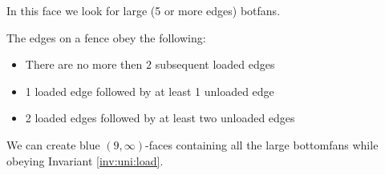    In this face we look for large (5 or more edges) botfans.

    \begin{invariants}
      \label{inv:uni:load}
      \item The edges on a fence obey the following:
      \begin{itemize}
        \item There are no more then $2$ subsequent loaded edges
        \item 1 loaded edge followed by at least 1 unloaded edge
        \item 2 loaded edges followed by at least two unloaded edges
      \end{itemize}
    \end{invariants}


    \begin{lemma}
      \label{lm:uni:removingLargeB-fans}
      We can create blue $(9, \infty)$-faces containing all the large bottomfans while obeying Invariant \ref{inv:uni:load}.
    \end{lemma}


